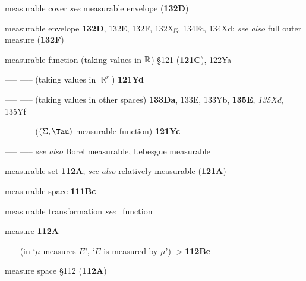 





measurable cover {\it see} measurable envelope ({\bf 132D})

measurable envelope {\bf 132D}, 132E, 132F, 132Xg, 134Fc, 134Xd;  
  {\it see also }
  full outer measure ({\bf 132F})



measurable function (taking values in $\Bbb R$) \S121 ({\bf 121C}),
122Ya

----- -----  (taking values in $\BbbR^r$) {\bf 121Yd}

----- -----  (taking values in other spaces) {\bf 133Da}, 133E, 133Yb,
{\bf 135E}, {\it 135Xd}, 135Yf  

----- ----- ($(\Sigma,\Tau)$-measurable function) {\bf 121Yc}

----- -----  {\it see also} Borel measurable, Lebesgue measurable






measurable set {\bf 112A};
  {\it see also }
relatively measurable ({\bf 121A})


measurable space {\bf 111Bc}



measurable transformation
  {\it see} \imp\ function

measure {\bf 112A}

----- (in `$\mu$ measures $E$', `$E$ is measured by $\mu$') {\bf $\pmb{>}$112Be}














































measure space \S112 ({\bf 112A})


















